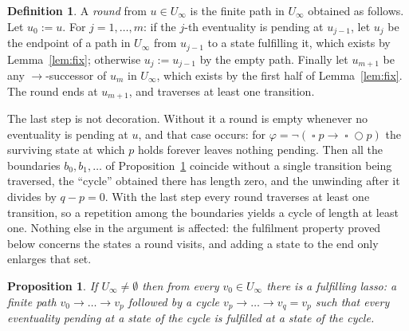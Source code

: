 \documentclass[11pt,a4paper]{article}
\newtheorem{proposition}[theorem]{Proposition}
\theoremstyle{definition}
\newtheorem{definition}[theorem]{Definition}
\newcommand{\Next}{\mathop{\bigcirc}}
\newcommand{\Always}{\mathop{\square}}
\begin{document}
\begin{definition}\label{def:round}
A \emph{round} from $u\in U_\infty$ is the finite path in $U_\infty$ obtained as
follows.  Let $u_0:=u$.  For $j=1,\dots,m$: if the $j$-th eventuality is pending
at $u_{j-1}$, let $u_j$ be the endpoint of a path in $U_\infty$ from $u_{j-1}$
to a state fulfilling it, which exists by Lemma~\ref{lem:fix}; otherwise
$u_j:=u_{j-1}$ by the empty path.  Finally let $u_{m+1}$ be any
$\to$-successor of $u_m$ in $U_\infty$, which exists by the first half of
Lemma~\ref{lem:fix}.  The round ends at $u_{m+1}$, and traverses at least one
transition.
\end{definition}

The last step is not decoration.  Without it a round is empty whenever no
eventuality is pending at $u$, and that case occurs: for
$\varphi=\neg(\Always p\to\Always\Next p)$ the surviving state at which $p$
holds forever leaves nothing pending.  Then all the boundaries
$b_0,b_1,\dots$ of Proposition~\ref{prop:lasso} coincide without a single
transition being traversed, the ``cycle'' obtained there has length zero, and
the unwinding after it divides by $q-p=0$.  With the last step every round
traverses at least one transition, so a repetition among the boundaries yields a
cycle of length at least one.  Nothing else in the argument is affected: the
fulfilment property proved below concerns the states a round visits, and adding
a state to the end only enlarges that set.

\begin{proposition}\label{prop:lasso}
If $U_\infty\neq\emptyset$ then from every $v_0\in U_\infty$ there is a
\emph{fulfilling lasso}: a finite path $v_0\to\dots\to v_p$ followed by a cycle
$v_p\to\dots\to v_q=v_p$ such that every eventuality pending at a state of the
cycle is fulfilled at a state of the cycle.
\end{proposition}
\end{document}
